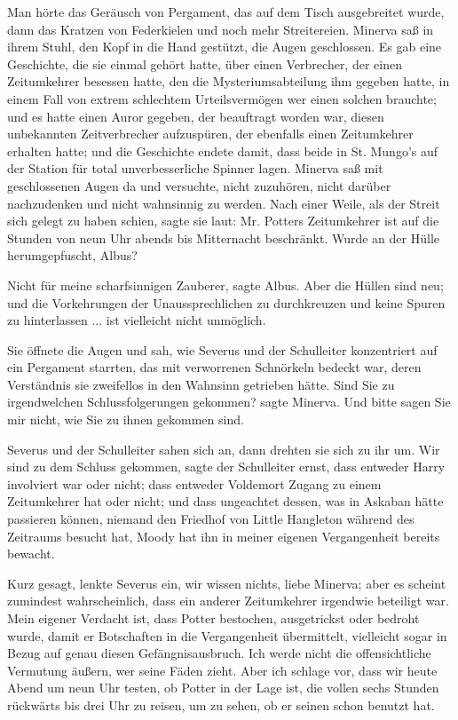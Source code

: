 Man hörte das Geräusch von Pergament, das auf dem Tisch ausgebreitet wurde, dann
das Kratzen von Federkielen und noch mehr Streitereien. Minerva saß in ihrem
Stuhl, den Kopf in die Hand gestützt, die Augen geschlossen. Es gab eine
Geschichte, die sie einmal gehört hatte, über einen Verbrecher, der einen
Zeitumkehrer besessen hatte, den die Mysteriumsabteilung ihm gegeben hatte, in
einem Fall von extrem schlechtem Urteilsvermögen wer einen solchen brauchte; und
es hatte einen Auror gegeben, der beauftragt worden war, diesen unbekannten
Zeitverbrecher aufzuspüren, der ebenfalls einen Zeitumkehrer erhalten hatte; und
die Geschichte endete damit, dass beide in St. Mungo's auf der Station für total
unverbesserliche Spinner lagen. Minerva saß mit geschlossenen Augen da und
versuchte, nicht zuzuhören, nicht darüber nachzudenken und nicht wahnsinnig zu
werden. Nach einer Weile, als der Streit sich gelegt zu haben schien, sagte sie
laut: \glqq Mr. Potters Zeitumkehrer ist auf die Stunden von neun Uhr abends bis
Mitternacht beschränkt. Wurde an der Hülle herumgepfuscht, Albus?\grqq{}

\glqq Nicht für meine scharfsinnigen Zauberer\grqq{}, sagte Albus. \glqq Aber
die Hüllen sind neu; und die Vorkehrungen der Unaussprechlichen zu durchkreuzen
und keine Spuren zu hinterlassen ... ist vielleicht nicht unmöglich.\grqq{}

Sie öffnete die Augen und sah, wie Severus und der Schulleiter konzentriert auf
ein Pergament starrten, das mit verworrenen Schnörkeln bedeckt war, deren
Verständnis sie zweifellos in den Wahnsinn getrieben hätte. \glqq Sind Sie zu
irgendwelchen Schlussfolgerungen gekommen?\grqq{} sagte Minerva. \glqq Und bitte
sagen Sie mir nicht, wie Sie zu ihnen gekommen sind.\grqq{}

Severus und der Schulleiter sahen sich an, dann drehten sie sich zu ihr um.
\glqq Wir sind zu dem Schluss gekommen\grqq{}, sagte der Schulleiter ernst,
\glqq dass entweder Harry involviert war oder nicht; dass entweder Voldemort
Zugang zu einem Zeitumkehrer hat oder nicht; und dass ungeachtet dessen, was in
Askaban hätte passieren können, niemand den Friedhof von Little Hangleton
während des Zeitraums besucht hat, Moody hat ihn in meiner eigenen Vergangenheit
bereits bewacht.\grqq{}

\glqq Kurz gesagt\grqq{}, lenkte Severus ein, \glqq wir wissen nichts, liebe
Minerva; aber es scheint zumindest wahrscheinlich, dass ein anderer Zeitumkehrer
irgendwie beteiligt war. Mein eigener Verdacht ist, dass Potter bestochen,
ausgetrickst oder bedroht wurde, damit er Botschaften in die Vergangenheit
übermittelt, vielleicht sogar in Bezug auf genau diesen Gefängnisausbruch. Ich
werde nicht die offensichtliche Vermutung äußern, wer seine Fäden zieht. Aber
ich schlage vor, dass wir heute Abend um neun Uhr testen, ob Potter in der Lage
ist, die vollen sechs Stunden rückwärts bis drei Uhr zu reisen, um zu sehen, ob
er seinen schon benutzt hat.\grqq{}

